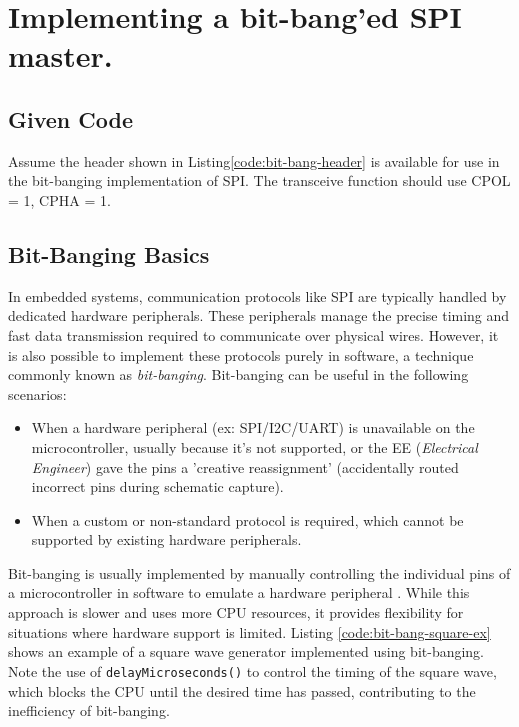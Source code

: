 \documentclass[main.tex]{subfiles}
\begin{document}
\section{Implementing a bit-bang'ed SPI master.}

\subsection{Given Code}
Assume the header shown in Listing\ref{code:bit-bang-header} is available for use in the bit-banging implementation of SPI. The transceive function should use CPOL = 1, CPHA = 1. 



\spoilerline

\subsection{Bit-Banging Basics}
In embedded systems, communication protocols like SPI are typically handled by dedicated hardware peripherals. These peripherals manage the precise timing and fast data transmission required to communicate over physical wires. However, it is also possible to implement these protocols purely in software, a technique commonly known as \textit{bit-banging}. Bit-banging can be useful in the following scenarios:
\begin{itemize}
    \item When a hardware peripheral (ex: SPI/I2C/UART) is unavailable on the microcontroller, usually because it's not supported, or the EE (\textit{Electrical Engineer}) gave the pins a 'creative reassignment' (accidentally routed incorrect pins during schematic capture).
    \item When a custom or non-standard protocol is required, which cannot be supported by existing hardware peripherals.
\end{itemize}

\noindent Bit-banging is usually implemented by manually controlling the individual pins of a microcontroller in software to emulate a hardware peripheral \cite{looi_bitbanging}. While this approach is slower and uses more CPU resources, it provides flexibility for situations where hardware support is limited. Listing \ref{code:bit-bang-square-ex} shows an example of a square wave generator implemented using bit-banging. Note the use of \texttt{delayMicroseconds()} to control the timing of the square wave, which blocks the CPU until the desired time has passed, contributing to the inefficiency of bit-banging.
\end{document}
